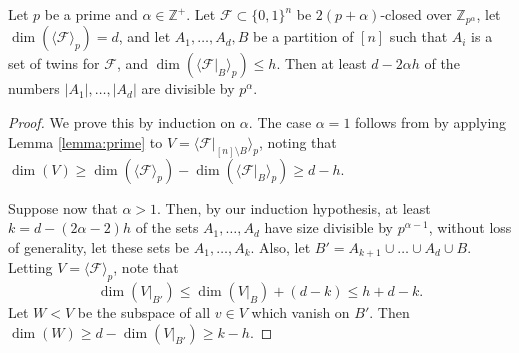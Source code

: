 	\begin{lemma}\label{lemma:primepower}
		Let $p$ be a prime and $\alpha\in\mathbb{Z}^{+}$. Let $\mathcal{F}\subset \{0,1\}^{n}$ be $2(p+\alpha)$-closed over $\mathbb{Z}_{p^{\alpha}}$, let $\dim(\langle \mathcal{F}\rangle_p)=d$, and let $A_1,\dots,A_d,B$ be a partition of $[n]$ such that $A_{i}$ is a set of twins for $\mathcal{F}$, and $\dim(\langle \mathcal{F}|_{B}\rangle_{p})\leq h$.  Then at least $d-2\alpha h$ of the numbers $|A_1|,\dots,|A_d|$ are divisible by $p^{\alpha}$.
	\end{lemma}
	
	\begin{proof}
		We prove this by induction on $\alpha$. The case $\alpha=1$ follows from by applying Lemma \ref{lemma:prime} to 
		$V = \langle \mathcal{F}|_{[n] \setminus B}\rangle_{p}$, 
		noting that 
		$\dim(V)\geq \dim(\langle \mathcal{F}\rangle_p) - \dim(\langle \mathcal{F}|_{B}\rangle_{p}) \geq d-h$.
		
		Suppose now that $\alpha>1$. Then, by our induction hypothesis, at least $k=d-(2\alpha-2)h$ of the sets $A_1,\dots,A_d$ have size divisible by $p^{\alpha-1}$, without loss of generality, let these sets be $A_1,\dots,A_k$. Also, let $B'=A_{k+1}\cup\dots\cup A_{d}\cup B$. Letting $V=\langle \mathcal{F}\rangle_p$, note that $$\dim(V|_{B'})\leq \dim(V|_{B})+(d-k)\leq h+d-k.$$ 
		Let $W < V$ be the subspace of all $v \in V$ which vanish on $B'$. Then $\dim(W)\geq d-\dim(V|_{B'})\geq k-h$.
		

\end{proof}
